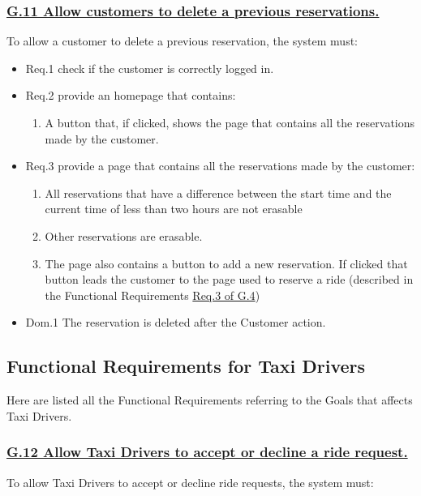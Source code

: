 			\subsubsection{\lbrack \hyperref[sec:g11]{G.11 Allow customers to delete a previous reservations.}\rbrack}\label{sec:frs11}
			To allow a customer to delete a previous reservation, the system must:

				\begin{itemize}
					\item \lbrack Req.1\rbrack \label{sec:fr1_g11} check if the customer is correctly logged in.
					\item \lbrack Req.2\rbrack \label{sec:fr2_g11} provide an homepage that contains:
						\begin{enumerate}
							\item A button that, if clicked, shows the page that contains all the reservations made by the customer.
						\end{enumerate}
					\item \lbrack Req.3\rbrack \label{sec:fr3_g11} provide a page that contains all the reservations made by the customer:
						\begin{enumerate}
							\item All reservations that have a difference between the start time and the current time of less than two hours are not erasable
							\item Other reservations are erasable.
							\item The page also contains a button to add a new reservation. If clicked that button leads the customer to the page used to reserve a ride (described in the Functional Requirements \hyperref[sec:fr3_g4]{Req.3 of G.4})
						\end{enumerate}
					\item \lbrack Dom.1\rbrack \label{sec:da1_g11} The reservation is deleted after the Customer action.
				\end{itemize}

		\subsection{Functional Requirements for Taxi Drivers}
		Here are listed all the Functional Requirements referring to the Goals that affects Taxi Drivers.

			\subsubsection{\lbrack \hyperref[sec:g12]{G.12 Allow Taxi Drivers to accept or decline a ride request.}\rbrack}\label{sec:frs12}
			To allow Taxi Drivers to accept or decline ride requests, the system must:

